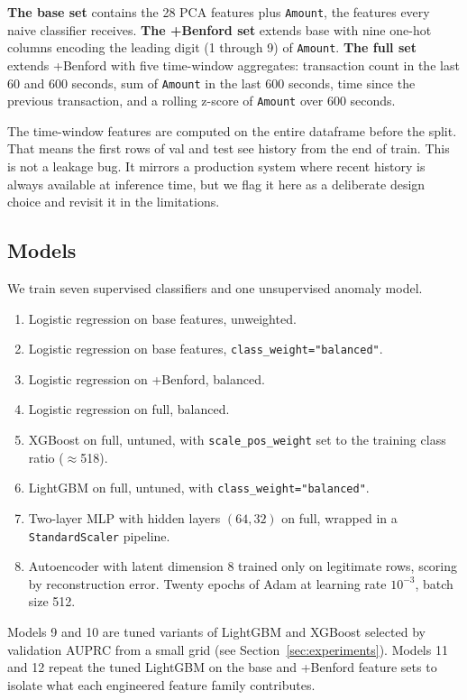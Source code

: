 \documentclass{article}
\begin{document}
\textbf{The base set} contains the 28 PCA features plus \texttt{Amount}, the features every naive classifier receives. \textbf{The +Benford set} extends base with nine one-hot columns encoding the leading digit (1 through 9) of \texttt{Amount}. \textbf{The full set} extends +Benford with five time-window aggregates: transaction count in the last 60 and 600 seconds, sum of \texttt{Amount} in the last 600 seconds, time since the previous transaction, and a rolling z-score of \texttt{Amount} over 600 seconds.

The time-window features are computed on the entire dataframe before the split. That means the first rows of val and test see history from the end of train. This is not a leakage bug. It mirrors a production system where recent history is always available at inference time, but we flag it here as a deliberate design choice and revisit it in the limitations.

\subsection{Models}

We train seven supervised classifiers and one unsupervised anomaly model.

\begin{enumerate}
\item Logistic regression on base features, unweighted.
\item Logistic regression on base features, \texttt{class\_weight="balanced"}.
\item Logistic regression on +Benford, balanced.
\item Logistic regression on full, balanced.
\item XGBoost on full, untuned, with \texttt{scale\_pos\_weight} set to the training class ratio ($\approx$518).
\item LightGBM on full, untuned, with \texttt{class\_weight="balanced"}.
\item Two-layer MLP with hidden layers $(64, 32)$ on full, wrapped in a \texttt{StandardScaler} pipeline.
\item Autoencoder with latent dimension 8 trained only on legitimate rows, scoring by reconstruction error. Twenty epochs of Adam at learning rate $10^{-3}$, batch size 512.
\end{enumerate}

Models 9 and 10 are tuned variants of LightGBM and XGBoost selected by validation AUPRC from a small grid (see Section~\ref{sec:experiments}). Models 11 and 12 repeat the tuned LightGBM on the base and +Benford feature sets to isolate what each engineered feature family contributes.
\end{document}
